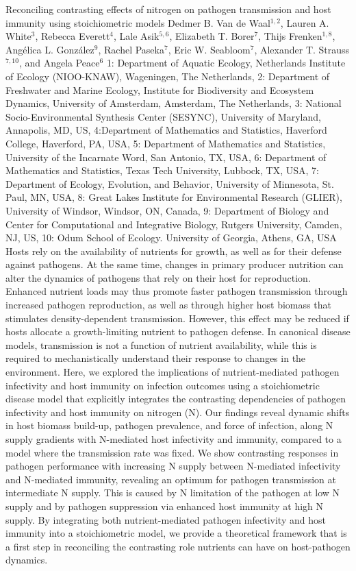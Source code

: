 \begin{addmargin}[2em]{0em}
\vspace{1.5ex}
\abs
{Reconciling contrasting effects of nitrogen on pathogen transmission and host immunity using stoichiometric models }
{Dedmer B. Van de Waal$^{1,2}$, Lauren A. White$^{3}$, Rebecca Everett$^{4}$, Lale Asik$^{5,6}$, Elizabeth T. Borer$^{7}$, Thijs Frenken$^{1,8}$, Angélica L. González$^{9}$, Rachel Paseka$^{7}$, Eric W. Seabloom$^{7}$, Alexander T. Strauss$^{7,10}$, and Angela Peace$^{6}$}
{1: Department of Aquatic Ecology, Netherlands Institute of Ecology (NIOO-KNAW), Wageningen, The Netherlands, 2: Department of Freshwater and Marine Ecology, Institute for Biodiversity and Ecosystem Dynamics, University of Amsterdam, Amsterdam, The Netherlands, 3: National Socio-Environmental Synthesis Center (SESYNC), University of Maryland, Annapolis, MD, US, 4:Department of Mathematics and Statistics, Haverford College, Haverford, PA, USA, 5: Department of Mathematics and Statistics, University of the Incarnate Word, San Antonio, TX, USA, 6: Department of Mathematics and Statistics, Texas Tech University, Lubbock, TX, USA, 7: Department of Ecology, Evolution, and Behavior, University of Minnesota, St. Paul, MN, USA, 8: Great Lakes Institute for Environmental Research (GLIER), University of Windsor, Windsor, ON, Canada, 9: Department of Biology and Center for Computational and Integrative Biology, Rutgers University, Camden, NJ, US, 10: Odum School of Ecology. University of Georgia, Athens, GA, USA}
{Hosts rely on the availability of nutrients for growth, as well as for their defense against pathogens. At the same time, changes in primary producer nutrition can alter the dynamics of pathogens that rely on their host for reproduction. Enhanced nutrient loads may thus promote faster pathogen transmission through increased pathogen reproduction, as well as through higher host biomass that stimulates density-dependent transmission. However, this effect may be reduced if hosts allocate a growth-limiting nutrient to pathogen defense. In canonical disease models, transmission is not a function of nutrient availability, while this is required to mechanistically understand their response to changes in the environment. Here, we explored the implications of nutrient-mediated pathogen infectivity and host immunity on infection outcomes using a stoichiometric disease model that explicitly integrates the contrasting dependencies of pathogen infectivity and host immunity on nitrogen (N). Our findings reveal dynamic shifts in host biomass build-up, pathogen prevalence, and force of infection, along N supply gradients with N-mediated host infectivity and immunity, compared to a model where the transmission rate was fixed. We show contrasting responses in pathogen performance with increasing N supply between N-mediated infectivity and N-mediated immunity, revealing an optimum for pathogen transmission at intermediate N supply. This is caused by N limitation of the pathogen at low N supply and by pathogen suppression via enhanced host immunity at high N supply. By integrating both nutrient-mediated pathogen infectivity and host immunity into a stoichiometric model, we provide a theoretical framework that is a first step in reconciling the contrasting role nutrients can have on host-pathogen dynamics.}



\end{addmargin}
